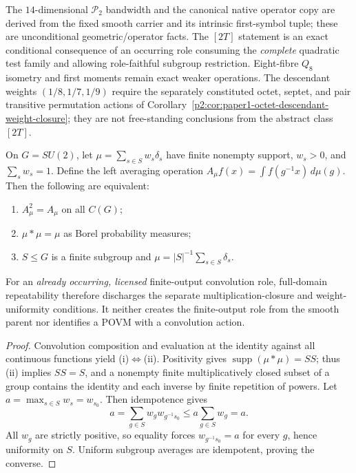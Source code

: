 \documentclass[12pt,a4paper]{article}
\begin{document}
\begin{remark}
\label{p2a:rem:v268-problem3-ledger}
The $14$-dimensional $\mathcal P_2$ bandwidth and the canonical native
operator copy are derived from the fixed smooth carrier and its
intrinsic first-symbol tuple; these are unconditional geometric/operator
facts.  The $[2T]$ statement is an exact conditional consequence of an
occurring role consuming the \emph{complete} quadratic test family
and allowing role-faithful subgroup restriction.  Eight-fibre
$Q_8$ isometry and first moments remain exact weaker operations.
The descendant weights $(1/8,1/7,1/9)$ require the separately
constituted octet, septet, and pair transitive permutation actions of
Corollary~\ref{p2:cor:paper1-octet-descendant-weight-closure}; they
are not free-standing conclusions from the abstract class $[2T]$.
\end{remark}






\begin{theorem}
\label{p2a:thm:v273-positive-repeatable-convolution-group}
On $G=SU(2)$, let
$\mu=\sum_{s\in S}w_s\delta_s$ have finite nonempty support,
$w_s>0$, and $\sum_sw_s=1$. Define the left averaging operation
$A_\mu f(x)=\int f(g^{-1}x)\,d\mu(g)$.
Then the following are equivalent:
\begin{enumerate}[label=(\roman*),leftmargin=2em]
\item $A_\mu^2=A_\mu$ on all $C(G)$;
\item $\mu*\mu=\mu$ as Borel probability measures;
\item $S\le G$ is a finite subgroup and
      $\mu=|S|^{-1}\sum_{s\in S}\delta_s$.
\end{enumerate}
For an \emph{already occurring, licensed} finite-output convolution
role, full-domain repeatability therefore discharges the separate
multiplication-closure and weight-uniformity conditions.
It neither creates the finite-output role from the smooth parent nor
identifies a POVM with a convolution action.
\end{theorem}
\begin{proof}
Convolution composition and evaluation at the identity against all
continuous functions yield (i)$\Leftrightarrow$(ii).
Positivity gives $\operatorname{supp}(\mu*\mu)=SS$;
thus (ii) implies $SS=S$, and a nonempty finite multiplicatively
closed subset of a group contains the identity and each inverse by
finite repetition of powers. Let $a=\max_{s\in S}w_s=w_{s_0}$.
Then idempotence gives
\[
 a=\sum_{g\in S}w_gw_{g^{-1}s_0}
       \le a\sum_{g\in S}w_g=a.
\]
All $w_g$ are strictly positive, so equality forces
$w_{g^{-1}s_0}=a$ for every $g$, hence uniformity on $S$.
Uniform subgroup averages are idempotent, proving the converse.
\end{proof}
\end{document}
